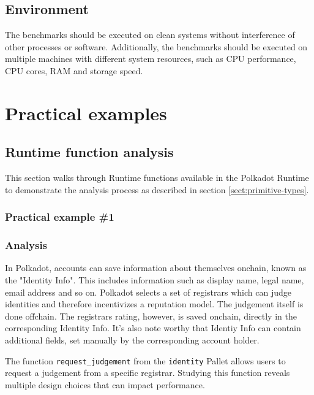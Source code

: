 \documentclass[11pt,a4paper]{article}
\begin{document}
\subsection{Environment}
The benchmarks should be executed on clean systems without interference of other processes
or software. Additionally, the benchmarks should be executed on multiple machines with different
system resources, such as CPU performance, CPU cores, RAM and storage speed.

\section{Practical examples}

\subsection{Runtime function analysis}\label{sect:examples-runtime-analysis}

This section walks through Runtime functions available in the Polkadot Runtime to
demonstrate the analysis process as described in section \ref{sect:primitive-types}.

\subsubsection{Practical example \#1}

\subsubsection*{Analysis}

In Polkadot, accounts can save information about themselves onchain, known as the "Identity Info".
This includes information such as display name, legal name, email address and so on. Polkadot selects
a set of registrars which can judge identities and therefore incentivizes a reputation model. The judgement itself
is done offchain. The registrars rating, however, is saved onchain, directly in the corresponding 
Identity Info. It's also note worthy that Identiy Info can contain additional fields, set manually by
the corresponding account holder.
\newline

The function \verb|request_judgement| from the \verb|identity| Pallet allows users to request a judgement
from a specific registrar. Studying this function reveals multiple design choices that can impact performance.
\newline
\end{document}
